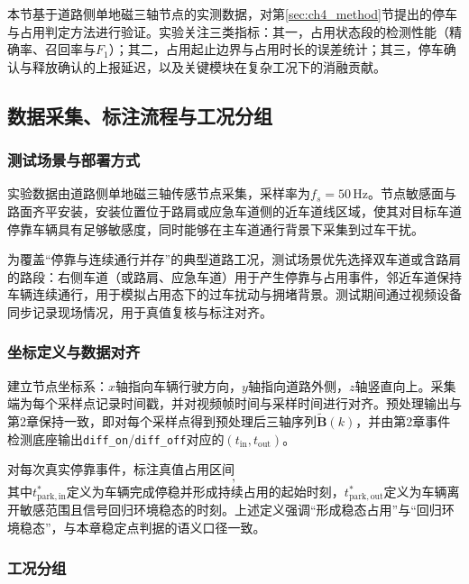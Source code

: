 \documentclass{xdupgthesis}
\begin{document}
本节基于道路侧单地磁三轴节点的实测数据，对第\ref{sec:ch4_method}节提出的停车与占用判定方法进行验证。实验关注三类指标：其一，占用状态段的检测性能（精确率、召回率与$F_1$）；其二，占用起止边界与占用时长的误差统计；其三，停车确认与释放确认的上报延迟，以及关键模块在复杂工况下的消融贡献。

\subsection{数据采集、标注流程与工况分组}
\label{subsec:ch4_data}

\subsubsection{测试场景与部署方式}

实验数据由道路侧单地磁三轴传感节点采集，采样率为$f_s=50\,\mathrm{Hz}$。节点敏感面与路面齐平安装，安装位置位于路肩或应急车道侧的近车道线区域，使其对目标车道停靠车辆具有足够敏感度，同时能够在主车道通行背景下采集到过车干扰。

为覆盖“停靠与连续通行并存”的典型道路工况，测试场景优先选择双车道或含路肩的路段：右侧车道（或路肩、应急车道）用于产生停靠与占用事件，邻近车道保持车辆连续通行，用于模拟占用态下的过车扰动与拥堵背景。测试期间通过视频设备同步记录现场情况，用于真值复核与标注对齐。

\subsubsection{坐标定义与数据对齐}

建立节点坐标系：$x$轴指向车辆行驶方向，$y$轴指向道路外侧，$z$轴竖直向上。采集端为每个采样点记录时间戳，并对视频帧时间与采样时间进行对齐。预处理输出与第2章保持一致，即对每个采样点得到预处理后三轴序列$\widetilde{\mathbf{B}}(k)$，并由第2章事件检测底座输出\texttt{diff\_on}/\texttt{diff\_off}对应的$(t_{\mathrm{in}},t_{\mathrm{out}})$。

对每次真实停靠事件，标注真值占用区间
\begin{equation}
[t^{*}_{\mathrm{park,in}},\,t^{*}_{\mathrm{park,out}}],
\end{equation}
其中$t^{*}_{\mathrm{park,in}}$定义为车辆完成停稳并形成持续占用的起始时刻，$t^{*}_{\mathrm{park,out}}$定义为车辆离开敏感范围且信号回归环境稳态的时刻。上述定义强调“形成稳态占用”与“回归环境稳态”，与本章稳定点判据的语义口径一致。

\subsubsection{工况分组}
\end{document}
